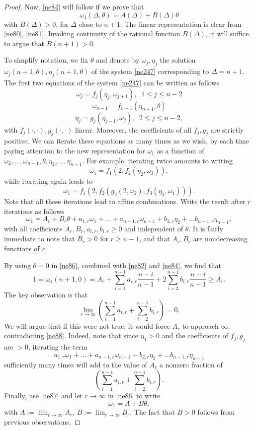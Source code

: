 \documentclass[amssymb,amsfonts,12pt]{amsart}
\begin{document}
\begin{proof}
Now,  \eqref{ne84} will follow if we prove that
\begin{equation}
\label{ne85}
\omega_1(\Delta,\theta)=A(\Delta)+B(\Delta)\theta
\end{equation}
with $B(\Delta)>0$, for $\Delta$ close to $n+1$. The linear representation is clear from  \eqref{ne80}, \eqref{ne81}. Invoking continuity of the rational function $B(\Delta)$, it will  suffice to argue that $B(n+1)>0$.

To simplify notation, we fix $\theta$ and denote by $\omega_j,\eta_j$ the solution $\omega_j(n+1,\theta),\eta_j(n+1,\theta)$ of the system \eqref{ne247} corresponding to $\Delta=n+1.$
The first two equations of the system \eqref{ne247}
can be written as follows
$$\omega_j=f_j(\eta_j,\omega_{j+1}),\;\;1\le j\le n-2$$
$$\omega_{n-1}=f_{n-1}(\eta_{n-1},\theta)$$
$$\eta_j=g_j(\eta_{j-1},\omega_j),\;\;2\le j\le n-2,$$
with  $f_j(\cdot,\cdot),g_j(\cdot,\cdot)$ linear. Moreover, the coefficients of all $f_j,g_j$ are strictly positive.
We can iterate these equations as many times as we wish, by each time paying attention to the new representation for $\omega_1$ as a function of $\omega_2,\ldots,\omega_{n-1},\theta,\eta_2,\ldots,\eta_{n-1}.$ For example, iterating twice amounts to writing
$$\omega_1=f_1(2,f_2(\eta_2,\omega_3)),$$
while iterating again leads to
$$\omega_1=f_1(2,f_2(g_2(2,\omega_2),f_3(\eta_3,\omega_{4}))).$$
Note that all these iterations lead to affine combinations. Write the result after $r$ iterations as follows
\begin{equation}
\label{ne86}
\omega_1=A_r+B_r\theta+a_{1,r}\omega_1+\ldots+a_{n-1,r}\omega_{n-1}+b_{2,r}\eta_2+\ldots b_{n-1,r}\eta_{n-1},
\end{equation}
with all coefficients $A_r,B_r,a_{i,r},b_{i,r}\ge 0$ and independent of $\theta$. It is fairly immediate to note that $B_r>0$ for $r\ge n-1$, and that $A_r,B_r$ are nondecreasing functions of $r$.

By using $\theta=0$ in \eqref{ne86}, combined with \eqref{ne82} and \eqref{ne84}, we find that
\begin{equation}
\label{ne88}
1=\omega_1(n+1,0)=A_r+\sum_{i=1}^{n-1}a_{i,r}\frac{n-i}{n-1}+2\sum_{i=2}^{n-1}b_{i,r}\frac{n-i}{n-1}\ge A_r.
\end{equation}
The key observation is that
\begin{equation}
\label{ne87}
\lim_{r\to\infty}(\sum_{i=1}^{n-1}a_{i,r}+\sum_{i=2}^{n-1}b_{i,r})=0.
\end{equation}
We will argue that if this were not true, it would force $A_r$ to approach $\infty$, contradicting \eqref{ne88}. Indeed, note that since $\eta_1>0$ and the coefficients of $f_j,g_j$ are $>0$, iterating the term $$a_{1,r}\omega_1+\ldots+a_{n-1,r}\omega_{n-1}+b_{2,r}\eta_2+\ldots b_{n-1,r}\eta_{n-1}$$
sufficiently many times will add to the value of $A_r$ a nonzero fraction of $$(\sum_{i=1}^{n-1}a_{i,r}+\sum_{i=2}^{n-1}b_{i,r}).$$
Finally, use \eqref{ne87} and let $r\to\infty$ in \eqref{ne86} to write
$$\omega_1=A+B\theta,$$
with $A:=\lim_{r\to\infty}A_r$, $B:=\lim_{r\to\infty}B_r$. The fact that $B>0$ follows from previous observations.

\end{proof}
\end{document}
